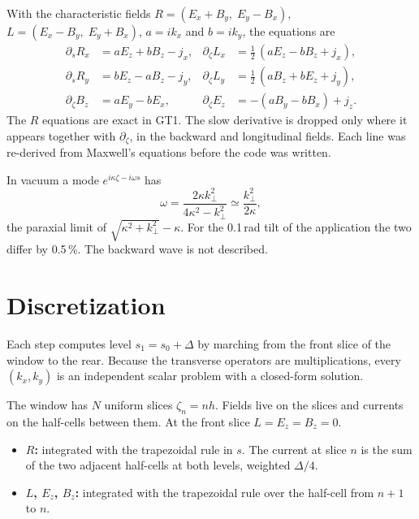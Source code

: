 \documentclass[11pt,a4paper]{article}
\newcommand{\kperp}{k_\perp}
\begin{document}
With the characteristic fields $R=(E_x+B_y,\;E_y-B_x)$, $L=(E_x-B_y,\;E_y+B_x)$, $a=ik_x$ and $b=ik_y$, the equations are
\begin{equation}
\begin{aligned}
\partial_s R_x &= a E_z + b B_z - j_x, & \partial_\zeta L_x &= \tfrac12\,(a E_z - b B_z + j_x),\\
\partial_s R_y &= b E_z - a B_z - j_y, & \partial_\zeta L_y &= \tfrac12\,(a B_z + b E_z + j_y),\\
\partial_\zeta B_z &= a E_y - b E_x, & \partial_\zeta E_z &= -(a B_y - b B_x) + j_z .
\end{aligned}
\label{eq:system}
\end{equation}
The $R$ equations are exact in GT1. The slow derivative is dropped only where it appears together with $\partial_\zeta$, in the backward and longitudinal fields. Each line was re-derived from Maxwell's equations before the code was written.

In vacuum a mode $e^{i\kappa\zeta-i\omega s}$ has
\begin{equation}
\omega=\frac{2\kappa\kperp^2}{4\kappa^2-\kperp^2}\simeq\frac{\kperp^2}{2\kappa},
\label{eq:disp}
\end{equation}
the paraxial limit of $\sqrt{\kappa^2+\kperp^2}-\kappa$. For the 0.1\,rad tilt of the application the two differ by 0.5\,\%. The backward wave is not described.

\section{Discretization}

Each step computes level $s_1=s_0+\Delta$ by marching from the front slice of the window to the rear. Because the transverse operators are multiplications, every $(k_x,k_y)$ is an independent scalar problem with a closed-form solution.

The window has $N$ uniform slices $\zeta_n=nh$. Fields live on the slices and currents on the half-cells between them. At the front slice $L=E_z=B_z=0$.
\begin{itemize}
\item \textbf{$R$:} integrated with the trapezoidal rule in $s$. The current at slice $n$ is the sum of the two adjacent half-cells at both levels, weighted $\Delta/4$.
\item \textbf{$L$, $E_z$, $B_z$:} integrated with the trapezoidal rule over the half-cell from $n+1$ to $n$.
\end{itemize}
\end{document}
